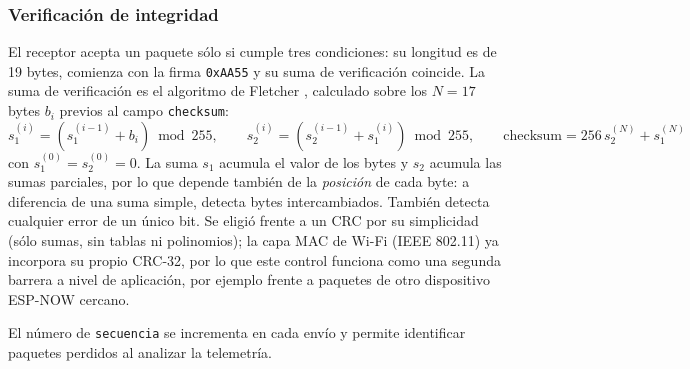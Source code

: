 \subsubsection{Verificación de integridad}

El receptor acepta un paquete sólo si cumple tres condiciones: su longitud es de 19 bytes, comienza con la firma \texttt{0xAA55} y su suma de verificación coincide. La suma de verificación es el algoritmo de Fletcher \cite{fletcher1982}, calculado sobre los $N = 17$ bytes $b_i$ previos al campo \texttt{checksum}:
\begin{equation}
s_1^{(i)} = \left(s_1^{(i-1)} + b_i\right) \bmod 255, \qquad
s_2^{(i)} = \left(s_2^{(i-1)} + s_1^{(i)}\right) \bmod 255, \qquad
\text{checksum} = 256\, s_2^{(N)} + s_1^{(N)}
\end{equation}
con $s_1^{(0)} = s_2^{(0)} = 0$. La suma $s_1$ acumula el valor de los bytes y $s_2$ acumula las sumas parciales, por lo que depende también de la \emph{posición} de cada byte: a diferencia de una suma simple, detecta bytes intercambiados. También detecta cualquier error de un único bit. Se eligió frente a un CRC por su simplicidad (sólo sumas, sin tablas ni polinomios); la capa MAC de Wi-Fi (IEEE 802.11) ya incorpora su propio CRC-32, por lo que este control funciona como una segunda barrera a nivel de aplicación, por ejemplo frente a paquetes de otro dispositivo ESP-NOW cercano.

El número de \texttt{secuencia} se incrementa en cada envío y permite identificar paquetes perdidos al analizar la telemetría.
